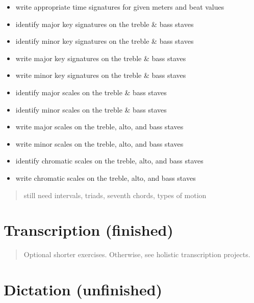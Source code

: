 \begin{itemize}
\item write appropriate time signatures for given meters and beat values

\item identify major key signatures on the treble \& bass staves

\item identify minor key signatures on the treble \& bass staves

\item write major key signatures on the treble \& bass staves

\item write minor key signatures on the treble \& bass staves

\item identify major scales on the treble \& bass staves

\item identify minor scales on the treble \& bass staves

\item write major scales on the treble, alto, and bass staves

\item write minor scales on the treble, alto, and bass staves

\item identify chromatic scales on the treble, alto, and bass staves

\item write chromatic scales on the treble, alto, and bass staves

\end{itemize}

\begin{quote}

still need intervals, triads, seventh chords, types of motion
\end{quote}

\section{Transcription (finished)}
\label{transcriptionfinished}

\begin{quote}

Optional shorter exercises. Otherwise, see holistic transcription projects.
\end{quote}

\section{Dictation (unfinished)}
\label{dictationunfinished}

